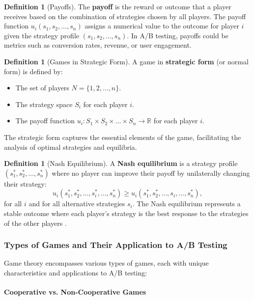 \documentclass[magisterska, english]{pwr_wmat_praca_dyplomowa}
\theoremstyle{plain}
\numberwithin{theorem}{chapter}
\theoremstyle{definition}
\numberwithin{theorem}{chapter}
\newtheorem{definition}[theorem]{Definition}
\begin{document}
\begin{definition}[Payoffs]
	 The \textbf{payoff} is the reward or outcome that a player receives based on the combination of strategies chosen by all players. The payoff function \( u_i(s_1, s_2, \dots, s_n) \) assigns a numerical value to the outcome for player \( i \) given the strategy profile \( (s_1, s_2, \dots, s_n) \). In A/B testing, payoffs could be metrics such as conversion rates, revenue, or user engagement.
\end{definition}



\begin{definition}[Games in Strategic Form]
	A game in \textbf{strategic form} (or normal form) is defined by:
	\begin{itemize}
		\item The set of players \( N = \{1, 2, \dots, n\} \).
		\item The strategy space \( S_i \) for each player \( i \).
		\item The payoff function \( u_i: S_1 \times S_2 \times \dots \times S_n \rightarrow \mathbb{R} \) for each player \( i \).
	\end{itemize}
	The strategic form captures the essential elements of the game, facilitating the analysis of optimal strategies and equilibria.
\end{definition}


\begin{definition}[Nash Equilibrium]
	A \textbf{Nash equilibrium} is a strategy profile \( (s_1^*, s_2^*, \dots, s_n^*) \) where no player can improve their payoff by unilaterally changing their strategy:
	\[
	u_i(s_1^*, s_2^*, \dots, s_i^*, \dots, s_n^*) \geq u_i(s_1^*, s_2^*, \dots, s_i, \dots, s_n^*),
	\]
	for all \( i \) and for all alternative strategies \( s_i \). The Nash equilibrium represents a stable outcome where each player's strategy is the best response to the strategies of the other players \cite{Nash1951}.
\end{definition}

\subsubsection{Types of Games and Their Application to A/B Testing}

Game theory encompasses various types of games, each with unique characteristics and applications to A/B testing:

\paragraph{Cooperative vs. Non-Cooperative Games}
\end{document}
